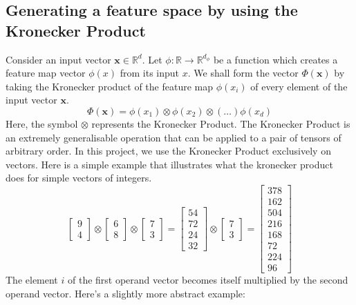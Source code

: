 \documentclass{article}
\theoremstyle{definition}
\theoremstyle{definition}
\begin{document}
\subsection{Generating a feature space by using the Kronecker Product}
Consider an input vector $\mathbf{x} \in \mathbb{R}^d$. Let $\phi : \mathbb{R} \to \mathbb{R}^{d_{\phi}}$ be a function which creates a feature map vector $\phi(x)$ from its input $x$.  We shall form the vector $\Phi(\mathbf{x})$ by taking the Kronecker product of the feature map $\phi(x_i)$ of every element of the input vector $\mathbf{x}$.
\begin{equation}
    \Phi(\mathbf{x}) = \phi(x_1) \otimes  \phi(x_2) 
                \otimes (\dots) \phi(x_d)
\end{equation}
Here, the symbol $\otimes$ represents the Kronecker Product. The Kronecker Product is an extremely generalisable operation that can be applied to a pair of tensors of arbitrary order. In this project, we use the Kronecker Product exclusively on vectors. Here is a simple example that illustrates what the kronecker product does for simple vectors of integers.
\[
\begin{bmatrix}
    9 \\ 4
\end{bmatrix}
\otimes
\begin{bmatrix}
    6 \\ 8
\end{bmatrix}
\otimes
\begin{bmatrix}
    7 \\ 3
\end{bmatrix}
=
\begin{bmatrix}
    54 \\ 72 \\ 24 \\ 32
\end{bmatrix}
\otimes
\begin{bmatrix}
    7 \\ 3
\end{bmatrix}
=
\begin{bmatrix}
    378 \\ 162\\ 504 \\216\\ 168\\ 72\\ 224\\ 96
\end{bmatrix}
\]
The element $i$ of the first operand vector becomes itself multiplied by the second operand vector. Here's a slightly more abstract example:
\end{document}
